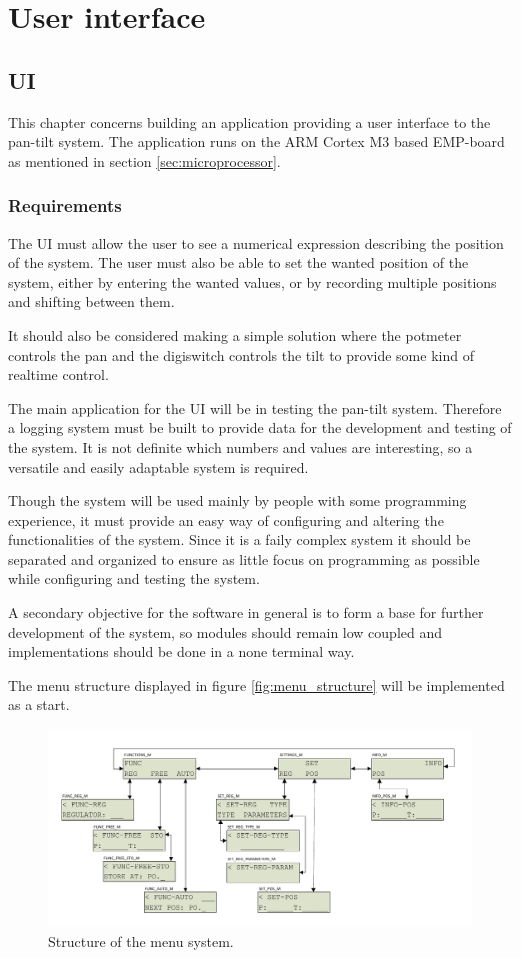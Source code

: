 \chapter{User interface}\label{chap:ui}

\section{UI}
This chapter concerns building an application providing a user interface to the
pan-tilt system. The application runs on the ARM Cortex M3 based EMP-board
as mentioned in section \ref{sec:microprocessor}.

\subsection{Requirements}
The UI must allow the user to see a numerical expression
describing the position of the system. The user must also be able to set the
wanted position of the system, either by entering the wanted values, or by
recording multiple positions and shifting between them.

It should also be considered making a simple solution where the potmeter
controls the pan and the digiswitch controls the tilt to provide some kind of
realtime control.

The main application for the UI will be in testing the pan-tilt system.
Therefore a logging system must be built to provide data for the development
and testing of the system. It is not definite which numbers and values are
interesting, so a versatile and easily adaptable system is required.

Though the system will be used mainly by people with some programming
experience, it must provide an easy way of configuring and altering the functionalities of the system. Since it is a faily complex system it should be separated and organized to ensure as little focus on programming as possible while configuring and testing the system.

A secondary objective for the software in general is to form a base for further development of the system, so modules should remain low coupled and implementations should be done in a none terminal way.

The  menu structure displayed in figure \ref{fig:menu_structure} will be implemented as a start.

\begin{figure}[htb]
	\centering
	\includegraphics[width=\textwidth,trim=0 0 0 0]{graphics/menu_structure.pdf} 
	\caption{Structure of the menu system.}
	\label{fig:ui_task_diagram}
\end{figure}

